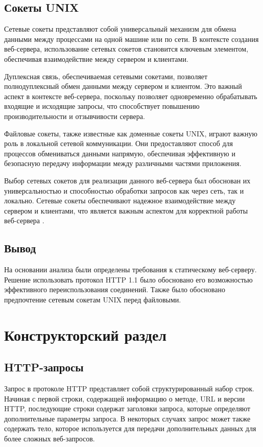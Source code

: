 \documentclass{bmstu}
\begin{document}
\section{Сокеты UNIX}

Сетевые сокеты представляют собой универсальный механизм для обмена данными между процессами на одной машине или по сети. В контексте создания веб-сервера, использование сетевых сокетов становится ключевым элементом, обеспечивая взаимодействие между сервером и клиентами.

Дуплексная связь, обеспечиваемая сетевыми сокетами, позволяет полнодуплексный обмен данными между сервером и клиентом. Это важный аспект в контексте веб-сервера, поскольку позволяет одновременно обрабатывать входящие и исходящие запросы, что способствует повышению производительности и отзывчивости сервера.

Файловые сокеты, также известные как доменные сокеты UNIX, играют важную роль в локальной сетевой коммуникации. Они предоставляют способ для процессов обмениваться данными напрямую, обеспечивая эффективную и безопасную передачу информации между различными частями приложения.

Выбор сетевых сокетов для реализации данного веб-сервера был обоснован их универсальностью и способностью обработки запросов как через сеть, так и локально. Сетевые сокеты обеспечивают надежное взаимодействие между сервером и клиентами, что является важным аспектом для корректной работы веб-сервера \cite{olifer2016}.

\section{Вывод}

На основании анализа были определены требования к статическому веб-серверу. Решение использовать протокол HTTP 1.1 было обосновано его возможностью эффективного переиспользования соединений. Также было обосновано предпочтение сетевым сокетам UNIX перед файловыми.

\chapter{Конструкторский раздел}

\section{HTTP-запросы}

Запрос в протоколе HTTP представляет собой структурированный набор строк. 
Начиная с первой строки, содержащей информацию о методе, URL и версии HTTP, 
последующие строки содержат заголовки запроса, которые определяют дополнительные 
параметры запроса. В некоторых случаях запрос может также содержать тело, которое 
используется для передачи дополнительных данных для более сложных веб-запросов.
\end{document}

